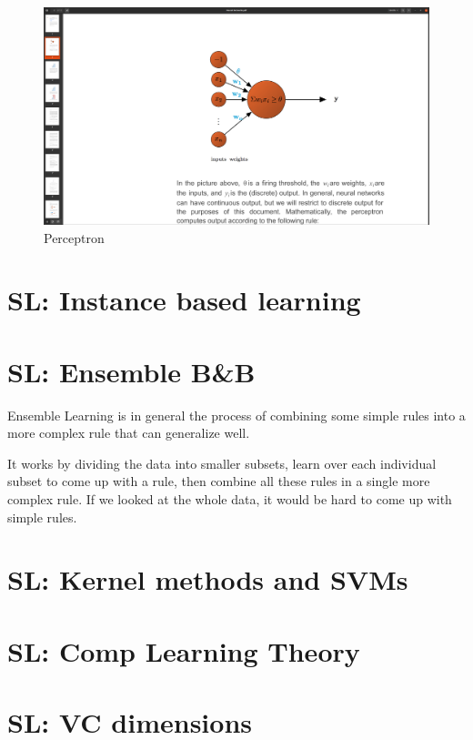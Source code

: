 \documentclass[12pt]{report}
\begin{document}
\begin{figure}[H]
	\centering
	\caption{Perceptron}
	\includegraphics[trim =20cm 15.0cm 10cm 8cm, clip, scale=0.2]{perceptron.png}
\end{figure}




\section{SL: Instance based learning}
\section{SL: Ensemble B\&B}

Ensemble Learning is in general the process of combining some simple rules into a more complex rule that can generalize well.

It works by dividing the data into smaller subsets, learn over each individual subset to come up with a rule, then combine all these rules in a single more complex rule. If we looked at the whole data, it would be hard to come up with simple rules.




\section{SL: Kernel methods and SVMs}
\section{SL: Comp Learning Theory}
\section{SL: VC dimensions}
\end{document}
